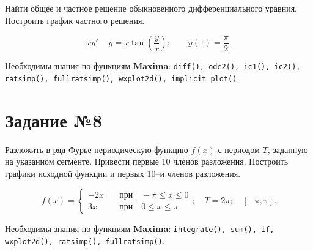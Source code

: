     Найти общее и частное решение обыкновенного дифференциального уравния. Построить график частного решения.

    \[
        x y' - y = x \tan \left( \frac{y}{x} \right); \qquad y(1) = \frac{\pi}{2}.
    \]

    Необходимы знания по функциям \textbf{Maxima}: {\tt diff(), ode2(), ic1(), ic2(), ratsimp(), fullratsimp(), wxplot2d(), implicit\_plot()}.

\section*{Задание №8}

    Разложить в ряд Фурье периодическую функцию $f(x)$ с периодом $T$, заданную на указанном сегменте. Привести первые 10 членов разложения. Построить графики исходной функции и первых 10--и членов разложения.

    \[
        f(x) =
            \begin{cases}
                -2 x \quad &\mbox{при} \quad -\pi \leq x \leq 0\\
                3 x \quad &\mbox{при} \quad 0 \leq x \leq \pi
            \end{cases}; \quad T = 2 \pi; \quad [-\pi, \pi].
    \]

    Необходимы знания по функциям \textbf{Maxima}: {\tt integrate(), sum(), if, wxplot2d(), ratsimp(), fullratsimp()}.

    \newpage
